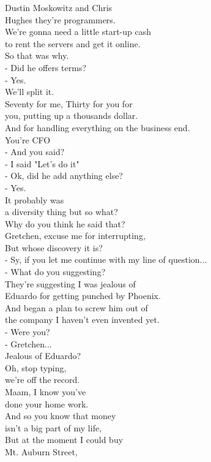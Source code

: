 \documentclass{article}
\begin{document}
\begin{multicols}{3}
Dustin Moskowitz and Chris\\
Hughes they're programmers.\\
We're gonna need a little start-up cash\\
to rent the servers and get it online.\\
So that was why.\\
- Did he offers terms?\\
- Yes.\\
We'll split it.\\
Seventy for me, Thirty for you for\\
you, putting up a thousands dollar.\\
And for handling everything on the business end.\\
You're CFO\\
- And you said?\\
- I said "Let's do it"\\
- Ok, did he add anything else?\\
- Yes.\\
It probably was\\
a diversity thing but so what?\\
Why do you think he said that?\\
Gretchen, excuse me for interrupting,\\
But whose discovery it is?\\
- Sy, if you let me continue with my line of question...\\
- What do you suggesting?\\
They're suggesting I was jealous of\\
Eduardo for getting punched by Phoenix.\\
And began a plan to screw him out of\\
the company I haven't even invented yet.\\
- Were you?\\
- Gretchen...\\
Jealous of Eduardo?\\
Oh, stop typing,\\
we're off the record.\\
Maam, I know you've\\
done your home work.\\
And so you know that money\\
isn't a big part of my life,\\
But at the moment I could buy\\
Mt. Auburn Street,\\

\end{multicols}
\end{document}

